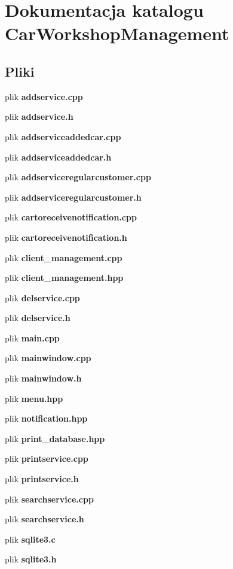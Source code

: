 \section{Dokumentacja katalogu Car\+Workshop\+Management}
\label{dir_f33f5eff36a7d054d09c3744531ae092}
\subsection*{Pliki}
\begin{DoxyCompactItemize}
\item 
plik \textbf{ addservice.\+cpp}
\item 
plik \textbf{ addservice.\+h}
\item 
plik \textbf{ addserviceaddedcar.\+cpp}
\item 
plik \textbf{ addserviceaddedcar.\+h}
\item 
plik \textbf{ addserviceregularcustomer.\+cpp}
\item 
plik \textbf{ addserviceregularcustomer.\+h}
\item 
plik \textbf{ cartoreceivenotification.\+cpp}
\item 
plik \textbf{ cartoreceivenotification.\+h}
\item 
plik \textbf{ client\+\_\+management.\+cpp}
\item 
plik \textbf{ client\+\_\+management.\+hpp}
\item 
plik \textbf{ delservice.\+cpp}
\item 
plik \textbf{ delservice.\+h}
\item 
plik \textbf{ main.\+cpp}
\item 
plik \textbf{ mainwindow.\+cpp}
\item 
plik \textbf{ mainwindow.\+h}
\item 
plik \textbf{ menu.\+hpp}
\item 
plik \textbf{ notification.\+hpp}
\item 
plik \textbf{ print\+\_\+database.\+hpp}
\item 
plik \textbf{ printservice.\+cpp}
\item 
plik \textbf{ printservice.\+h}
\item 
plik \textbf{ searchservice.\+cpp}
\item 
plik \textbf{ searchservice.\+h}
\item 
plik \textbf{ sqlite3.\+c}
\item 
plik \textbf{ sqlite3.\+h}
\end{DoxyCompactItemize}
